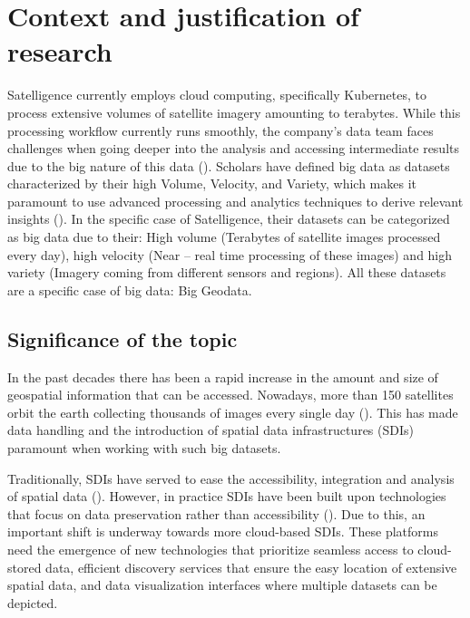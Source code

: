 \documentclass[
  oneside,
  open=any]{scrbook}
\begin{document}
\section{Context and justification of
research}\label{context-and-justification-of-research}

Satelligence currently employs cloud computing, specifically Kubernetes,
to process extensive volumes of satellite imagery amounting to
terabytes. While this processing workflow currently runs smoothly, the
company's data team faces challenges when going deeper into the analysis
and accessing intermediate results due to the big nature of this data
().
Scholars have defined big data as datasets characterized by their high
Volume, Velocity, and Variety, which makes it paramount to use advanced
processing and analytics techniques to derive relevant insights
(). In the specific
case of Satelligence, their datasets can be categorized as big data due
to their: High volume (Terabytes of satellite images processed every
day), high velocity (Near -- real time processing of these images) and
high variety (Imagery coming from different sensors and regions). All
these datasets are a specific case of big data: Big Geodata.

\subsection{Significance of the topic}\label{significance-of-the-topic}

In the past decades there has been a rapid increase in the amount and
size of geospatial information that can be accessed. Nowadays, more than
150 satellites orbit the earth collecting thousands of images every
single day (). This
has made data handling and the introduction of spatial data
infrastructures (SDIs) paramount when working with such big datasets.

Traditionally, SDIs have served to ease the accessibility, integration
and analysis of spatial data
(). However, in practice SDIs have been built upon technologies that
focus on data preservation rather than accessibility
(). Due to this,
an important shift is underway towards more cloud-based SDIs. These
platforms need the emergence of new technologies that prioritize
seamless access to cloud-stored data, efficient discovery services that
ensure the easy location of extensive spatial data, and data
visualization interfaces where multiple datasets can be depicted.
\end{document}
